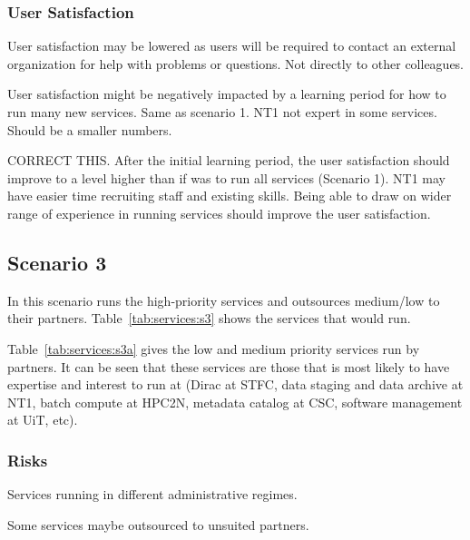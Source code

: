 \documentclass[12pt,a4paper]{article}
\begin{document}

\subsubsection*{User Satisfaction}
\bitm
\item \ED User satisfaction may be lowered as users will be required to contact an external organization for help with problems or questions. Not directly to other \EC colleagues.
\item User satisfaction might be negatively impacted by a learning period for how to run many new services. Same as scenario 1. NT1 not expert in some services. Should be a smaller numbers.
\item CORRECT THIS. After the initial learning period, the user satisfaction should improve to a level higher than if \EC was to run all services (Scenario 1).
NT1 may have easier time recruiting staff and existing skills.
Being able to draw on wider range of experience in running services should improve the user satisfaction.
\eitm


\subsection{Scenario 3}
\label{ssec:scen3}

In this scenario \EC runs the high-priority services and outsources medium/low to their partners.
Table~\ref{tab:services:s3} shows the services that \EC would run.

Table~\ref{tab:services:s3a} gives the low and medium priority services run by \EC partners.
It can be seen that these services are those that \EC is most likely to have expertise and interest to run at 
(Dirac at STFC, data staging and data archive at NT1, batch compute at HPC2N, metadata catalog at CSC, software management at UiT, etc).


\subsubsection*{Risks}
\bitm
  \item Services running in different administrative regimes.
  \item Some services maybe outsourced to unsuited partners.
\eitm
\end{document}
